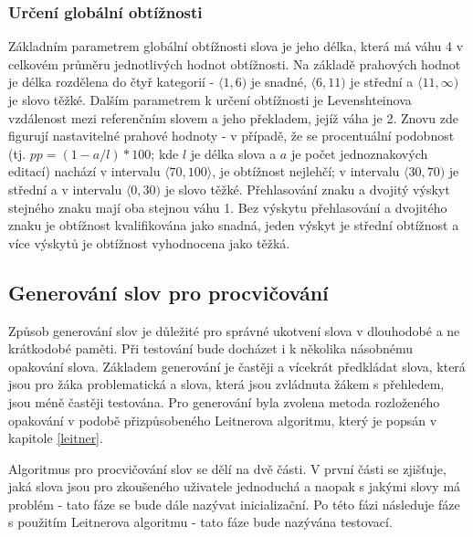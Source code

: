 \documentclass[a4paper,11pt,titlepage,fleqn]{article}
\begin{document}
        \subsubsection{Určení globální obtížnosti}
            Základním parametrem globální obtížnosti slova je jeho délka, která má váhu 4 v celkovém průměru jednotlivých hodnot obtížnosti. Na základě prahových hodnot je délka rozdělena do čtyř kategorií - $\langle1,6)$ je snadné, $\langle6,11)$ je střední a $\langle11,\infty)$ je slovo těžké. Dalším parametrem k určení obtížnosti je Levenshteinova vzdálenost mezi referenčním slovem a jeho překladem, jejíž váha je 2. Znovu zde figurují nastavitelné prahové hodnoty - v případě, že se procentuální podobnost (tj. $pp = (1-a/l)*100$; kde $l$ je délka slova a $a$ je počet jednoznakových editací) nachází v intervalu $\langle70,100\rangle$, je obtížnost nejlehčí; v intervalu $\langle30,70)$ je střední a v intervalu $\langle0,30)$ je slovo těžké. Přehlasování znaku a dvojitý výskyt stejného znaku mají oba stejnou váhu 1. Bez výskytu přehlasování a dvojitého znaku je obtížnost kvalifikována jako snadná, jeden výskyt je střední obtížnost a více výskytů je obtížnost vyhodnocena jako těžká.

    \subsection{Generování slov pro procvičování}
        Způsob generování slov je důležité pro správné ukotvení slova v dlouhodobé a ne krátkodobé paměti. Při testování bude docházet i k několika násobnému opakování slova. Základem generování je častěji a vícekrát předkládat slova, která jsou pro žáka problematická a slova, která jsou zvládnuta žákem s přehledem, jsou méně častěji testována. Pro generování byla zvolena metoda rozloženého opakování v podobě přizpůsobeného Leitnerova algoritmu, který je popsán v kapitole \ref{leitner}.
        
        Algoritmus pro procvičování slov se dělí na dvě části. V první části se zjišťuje, jaká slova jsou pro zkoušeného uživatele jednoduchá a naopak s jakými slovy má problém - tato fáze se bude dále nazývat inicializační. Po této fázi následuje fáze s použitím Leitnerova algoritmu - tato fáze bude nazývána testovací.
\end{document}

